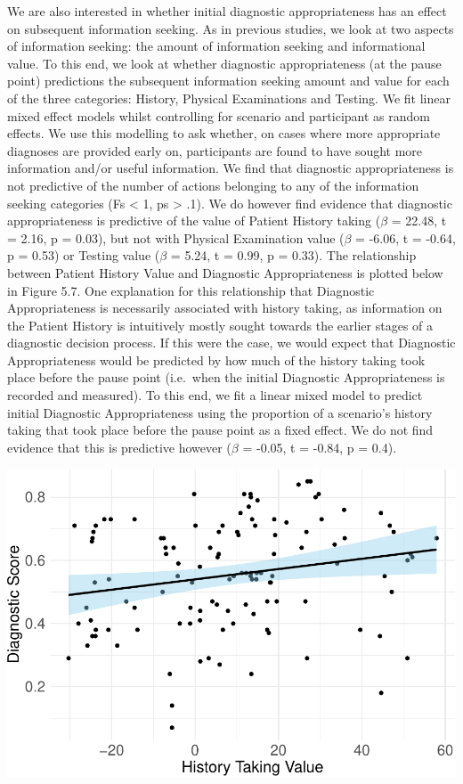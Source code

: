 \documentclass[a4paper, nobind]{templates/ociamthesis}
\begin{document}
\hfill\break
We are also interested in whether initial diagnostic appropriateness has an effect on subsequent information seeking. As in previous studies, we look at two aspects of information seeking: the amount of information seeking and informational value. To this end, we look at whether diagnostic appropriateness (at the pause point) predictions the subsequent information seeking amount and value for each of the three categories: History, Physical Examinations and Testing. We fit linear mixed effect models whilst controlling for scenario and participant as random effects. We use this modelling to ask whether, on cases where more appropriate diagnoses are provided early on, participants are found to have sought more information and/or useful information. We find that diagnostic appropriateness is not predictive of the number of actions belonging to any of the information seeking categories (Fs \textless{} 1, ps \textgreater{} .1). We do however find evidence that diagnostic appropriateness is predictive of the value of Patient History taking (\(\beta\) = 22.48, t = 2.16, p = 0.03), but not with Physical Examination value (\(\beta\) = -6.06, t = -0.64, p = 0.53) or Testing value (\(\beta\) = 5.24, t = 0.99, p = 0.33). The relationship between Patient History Value and Diagnostic Appropriateness is plotted below in Figure 5.7. One explanation for this relationship that Diagnostic Appropriateness is necessarily associated with history taking, as information on the Patient History is intuitively mostly sought towards the earlier stages of a diagnostic decision process. If this were the case, we would expect that Diagnostic Appropriateness would be predicted by how much of the history taking took place before the pause point (i.e.~when the initial Diagnostic Appropriateness is recorded and measured). To this end, we fit a linear mixed model to predict initial Diagnostic Appropriateness using the proportion of a scenario's history taking that took place before the pause point as a fixed effect. We do not find evidence that this is predictive however (\(\beta\) = -0.05, t = -0.84, p = 0.4).

\begin{center}\includegraphics[width=1\linewidth]{_main_files/figure-latex/historyvalplot-1} \end{center}
\end{document}
